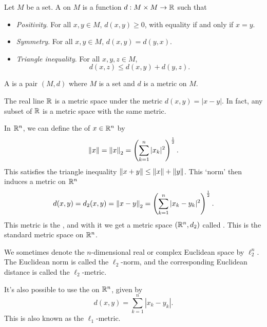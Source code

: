 \documentclass[a4paper]{scrartcl}
\begin{document}
\begin{definition}[Metric]
    Let $M$ be a set. A  on $M$ is a function $d: M \times M \rightarrow \mathbb{R}$ such that
    \begin{itemize}
        \item \emph{Positivity}. For all $x, y \in M$, $d(x, y) \geq 0$, with equality if and only if $x = y$.
        \item \emph{Symmetry}. For all $x, y \in M$, $d(x, y) = d(y, x)$.
        \item \emph{Triangle inequality}. For all $x, y, z \in M$,
        $$
        d(x, z) \leq d(x, y) + d(y, z).
        $$
    \end{itemize}
\end{definition}

\begin{definition}
    A  is a pair $(M, d)$ where $M$ is a set and $d$ is a metric on $M$. 
\end{definition}

\begin{example}
    The real line $\mathbb{R}$ is a metric space under the metric $d(x, y) = |x - y|$. In fact, any subset of $\mathbb{R}$ is a metric space with the same metric.
\end{example}

\begin{example}
   In $\mathbb{R}^n$, we can define the 
   of $x \in \mathbb{R}^n$ by
   $$
    \norm{x} = \norm{x}_2 = \left(\sum_{k = 1}^n |x_k|^2\right)^{\frac{1}{2}}.
   $$
   This satisfies the triangle inequality $\norm{x + y} \leq \norm{x} + \norm{y}$. This `norm' then induces a metric on $\mathbb{R}^n$
   $$
    d(x, y) = d_2(x, y) = \norm{x - y}_2 = \left(\sum_{k = 1}^n |x_k - y_k|^2\right)^{\frac{1}{2}}.
   $$
   This metric is the , and with it we get a metric space $(\mathbb{R}^n, d_2)$ called . This is the standard metric space on $\mathbb{R}^n$.
\end{example}
\begin{remark}
    We sometimes denote the $n$-dimensional real or complex Euclidean space by $\ell_2^n$. The Euclidean norm is called the $\ell_2$-norm, and the corresponding Euclidean distance is called the $\ell_2$-metric.
\end{remark}

\begin{example}
It's also possible to use the  on $\mathbb{R}^n$, given by
$$
d(x, y) = \sum_{k = 1}^{n} |x_k - y_k|.
$$
This is also known as the $\ell_1$-metric.
\end{example}
\end{document}
